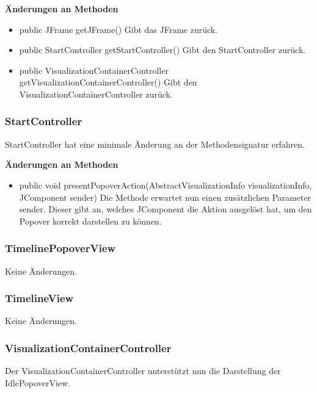 \documentclass{article}
\begin{document}
      \textbf{Änderungen an Methoden}
      \begin{itemize}
        \item public JFrame getJFrame()\newline
              Gibt das JFrame zurück.
        \item public StartController getStartController()\newline
              Gibt den StartController zurück.
        \item public VisualizationContainerController getVisualizationContainerController()\newline
              Gibt den VisualizationContainerController zurück.
      \end{itemize}

    \subsubsection{StartController}
      StartController hat eine minimale Änderung an der Methodensignatur erfahren.\newline

      \textbf{Änderungen an Methoden}
      \begin{itemize}
        \item public void presentPopoverAction(AbstractVisualizationInfo visualizationInfo, JComponent sender)\newline
              Die Methode erwartet nun einen zusätzlichen Parameter sender. Dieser gibt an, welches JComponent
              die Aktion ausgelöst hat, um den Popover korrekt darstellen zu können.
      \end{itemize}

    \subsubsection{TimelinePopoverView}
      Keine Änderungen.

    \subsubsection{TimelineView}
      Keine Änderungen.

    \subsubsection{VisualizationContainerController}
      Der VisualizationContainerController unterstützt nun die Darstellung der IdlePopoverView.\newline
\end{document}
